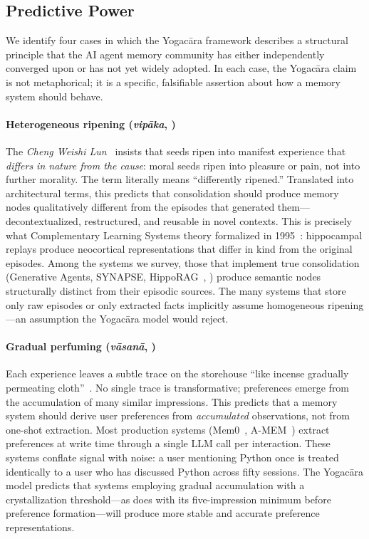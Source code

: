 \subsection{Predictive Power}
\label{sec:yogacara-predictive}

We identify four cases in which the Yogac\=ara framework describes a
structural principle that the AI agent memory community has either
independently converged upon or has not yet widely adopted.  In each
case, the Yogac\=ara claim is not metaphorical; it is a specific,
falsifiable assertion about how a memory system should behave.

\paragraph{Heterogeneous ripening (\emph{vip\=aka}, )}
The \emph{Cheng Weishi Lun}~\cite{chengweishilun} insists that seeds
ripen into manifest experience that \emph{differs in nature from the
cause}: moral seeds ripen into pleasure or pain, not into further
morality.  The term  literally means ``differently
ripened.''  Translated into architectural terms, this predicts that
consolidation should produce memory nodes qualitatively different from
the episodes that generated them---decontextualized, restructured, and
reusable in novel contexts.  This is precisely what Complementary
Learning Systems theory formalized in 1995~\cite{mcclelland1995}:
hippocampal replays produce neocortical representations that differ in
kind from the original episodes.  Among the systems we survey,
those that implement true consolidation (Generative Agents,
SYNAPSE, HippoRAG~\cite{gutierrez2024hipporag}, \alaya{}) produce
semantic nodes structurally distinct from their episodic sources.  The
many systems that store only raw episodes or only extracted facts
implicitly assume homogeneous ripening---an assumption the Yogac\=ara
model would reject.

\paragraph{Gradual perfuming (\emph{v\=asan\=a}, )}
Each experience leaves a subtle trace on the storehouse ``like incense
gradually permeating cloth''~\cite{yogacarabhumi}.  No single trace is
transformative; preferences emerge from the accumulation of many similar
impressions.  This predicts that a memory system should derive user
preferences from \emph{accumulated} observations, not from one-shot
extraction.  Most production systems (Mem0~\cite{choudhary2025mem0},
A-MEM~\cite{xu2025amem}) extract preferences at write time through a
single LLM call per interaction.  These systems conflate signal with
noise: a user mentioning Python once is treated identically to a user
who has discussed Python across fifty sessions.  The Yogac\=ara model
predicts that systems employing gradual accumulation with a
crystallization threshold---as \alaya{} does with its five-impression
minimum before preference formation---will produce more stable and
accurate preference representations.

